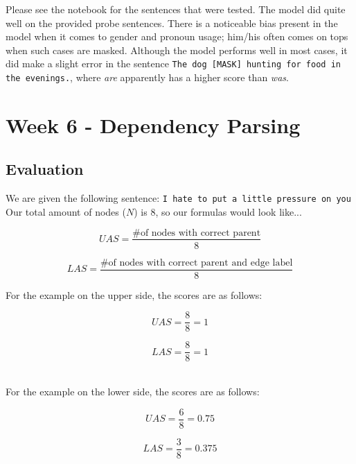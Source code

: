 \documentclass[a4paper, 11pt]{article}
\begin{document}
Please see the notebook for the sentences that were tested. The model did quite well on the provided probe sentences. There is a noticeable bias present in the model when it comes to gender and pronoun usage; him/his often comes on tops when such cases are masked. Although the model performs well in most cases, it did make a slight error in the sentence \texttt{The dog [MASK] hunting for food in the evenings.}, where \textit{are} apparently has a higher score than \textit{was}. 

\section{Week 6 - Dependency Parsing}

\subsection{Evaluation}

We are given the following sentence: \texttt{I hate to put a little pressure on you}\\

Our total amount of nodes ($N$) is 8, so our formulas would look like...

	\begin{equation}
		UAS = \frac{\text{\# of nodes with correct parent}}{8}
	\end{equation}

	\begin{equation}
		LAS = \frac{\text{\# of nodes with correct parent and edge label}}{8}
	\end{equation}

For the example on the upper side, the scores are as follows:

\noindent\begin{minipage}{.5\linewidth}
	\begin{equation}
		UAS = \frac{8}{8} = 1
	\end{equation}
\end{minipage}%
\begin{minipage}{.5\linewidth}
	\begin{equation}
		LAS = \frac{8}{8} = 1
	\end{equation}
\end{minipage}\\

For the example on the lower side, the scores are as follows:

\noindent\begin{minipage}{.5\linewidth}
	\begin{equation} 
		UAS = \frac{6}{8} = 0.75
	\end{equation}
\end{minipage}%
\begin{minipage}{.5\linewidth}
	\begin{equation}
		LAS = \frac{3}{8} = 0.375
	\end{equation}
\end{minipage}
\end{document}
